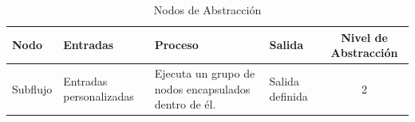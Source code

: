 \begin{table}[H]
    \centering
    \caption{Nodos de Abstracción}
    \begin{tabularx}{\textwidth}{ l X X X c }
        \hline
        \textbf{Nodo} & \textbf{Entradas}       & \textbf{Proceso}                                     & \textbf{Salida} & \textbf{Nivel de Abstracción} \\ \hline
        Subflujo      & Entradas personalizadas & Ejecuta un grupo de nodos encapsulados dentro de él. & Salida definida & 2                             \\ \hline
    \end{tabularx}
\end{table}

\endgroup